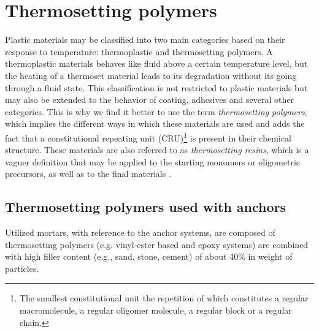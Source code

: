 \section{Thermosetting polymers}\label{sec:thermo_polymers}

Plastic materials may be classified into two main categories based on their response to temperature: thermoplastic and thermosetting polymers. A thermoplastic materials behaves like fluid above a certain temperature level, but the heating of a thermoset material leads to its degradation without its going through a fluid state. This classification is not restricted to plastic materials but may also be extended to the behavior of coating, adhesives and several other categories. This is why we find it better to use the term \textit{thermosetting polymers}, which implies the different ways in which these materials are used and adds the fact that a constitutional repeating unit (CRU)\footnote{The smallest constitutional unit the repetition of which constitutes a regular macromolecule, a regular oligomer molecule, a regular block or a regular chain.} is present in their chemical structure. These materials are also referred to as \textit{thermosetting resins}, which is a vaguer definition that may be applied to the starting monomers or oligometric precursors, as well as to the final materials \cite{thermosetting_polymers}. 

\subsection{Thermosetting polymers used with anchors}\label{subsec:polymers_in_anchors}
Utilized mortars, with reference to the anchor systems, are composed of thermosetting polymers (e.g. vinyl-ester based and epoxy systems) are combined with high filler content (e.g., sand, stone, cement) of about 40\% in weight of particles.

